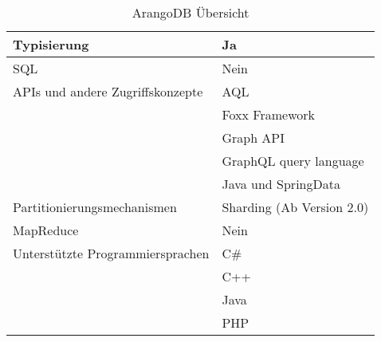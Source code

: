 \begin{table}[h]
\begin{tabular}{|l|l|}
Typisierung                      & Ja                                    \\ \hline
SQL                              & Nein                                  \\ \hline
APIs und andere Zugriffskonzepte & AQL                                   \\
                                 & Foxx Framework                        \\
                                 & Graph API                             \\
                                 & GraphQL query language                \\
                                 & Java und SpringData                   \\ \hline
Partitionierungsmechanismen      & Sharding (Ab Version 2.0)             \\ \hline
MapReduce                        & Nein                                  \\ \hline
Unterstützte Programmiersprachen & C\#                                   \\
                                 & C++                                    \\
                                 & Java                                  \\                                 & PHP                                   \\ \hline                 
    \end{tabular}
    \caption{ArangoDB Übersicht}
\label{table01}
\end{table}

